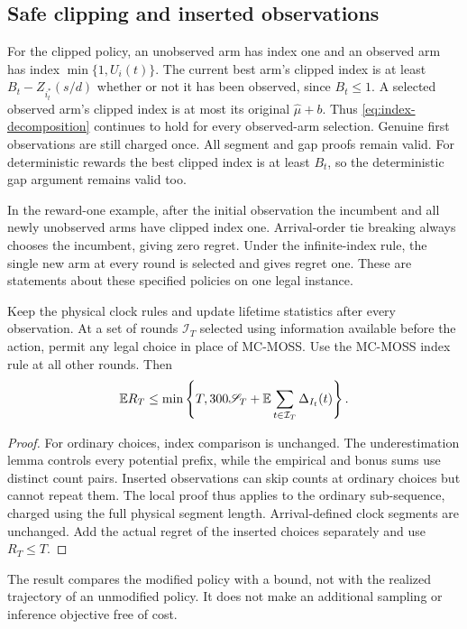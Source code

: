 \subsection{Safe clipping and inserted observations}
For the clipped policy, an unobserved arm has index one and an observed arm has index $\min\{1,U_i(t)\}$. The current best arm's clipped index is at least $B_t-Z_{i_t^*}(s/d)$ whether or not it has been observed, since $B_t\le1$. A selected observed arm's clipped index is at most its original $\widehat\mu+b$. Thus \eqref{eq:index-decomposition} continues to hold for every observed-arm selection. Genuine first observations are still charged once. All segment and gap proofs remain valid. For deterministic rewards the best clipped index is at least $B_t$, so the deterministic gap argument remains valid too.

In the reward-one example, after the initial observation the incumbent and all newly unobserved arms have clipped index one. Arrival-order tie breaking always chooses the incumbent, giving zero regret. Under the infinite-index rule, the single new arm at every round is selected and gives regret one. These are statements about these specified policies on one legal instance.

\begin{proposition}\label{prop:inserted}
Keep the physical clock rules and update lifetime statistics after every observation. At a set of rounds $\mathcal I_T$ selected using information available before the action, permit any legal choice in place of MC-MOSS. Use the MC-MOSS index rule at all other rounds. Then
\[
 \mathbb E R_T\le\min\left\{T,300\mathscr S_T+
 \mathbb E\sum_{t\in\mathcal I_T}\Delta_{I_t}(t)\right\}.
\]
\end{proposition}
\begin{proof}
For ordinary choices, index comparison is unchanged. The underestimation lemma controls every potential prefix, while the empirical and bonus sums use distinct count pairs. Inserted observations can skip counts at ordinary choices but cannot repeat them. The local proof thus applies to the ordinary sub-sequence, charged using the full physical segment length. Arrival-defined clock segments are unchanged. Add the actual regret of the inserted choices separately and use $R_T\le T$.
\end{proof}
The result compares the modified policy with a bound, not with the realized trajectory of an unmodified policy. It does not make an additional sampling or inference objective free of cost.

